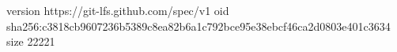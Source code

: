 version https://git-lfs.github.com/spec/v1
oid sha256:c3818cb9607236b5389c8ea82b6a1c792bce95e38ebcf46ca2d0803e401c3634
size 22221
